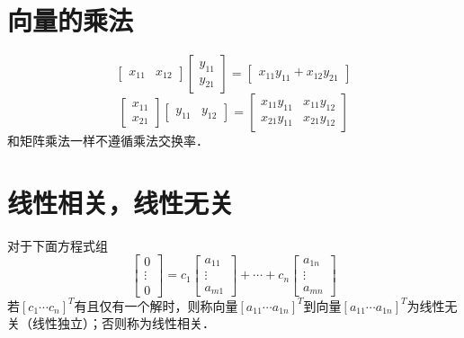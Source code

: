 \documentclass[12pt]{article}
\begin{document}
\begin{CJK}{UTF8}{gbsn}
\section{向量的乘法}
\begin{equation}
\left[
\begin{array}{cc}
x_{11} & x_{12}
\end{array}
\right]
\left[
\begin{array}{c}
y_{11} \\
y_{21}
\end{array}
\right]
=
\left[
\begin{array}{c}
x_{11}y_{11}+x_{12}y_{21}
\end{array}
\right]
\end{equation}
\begin{equation}
\left[
\begin{array}{c}
x_{11} \\
x_{21}
\end{array}
\right]
\left[
\begin{array}{cc}
y_{11} & y_{12}
\end{array}
\right]
=
\left[
\begin{array}{cc}
x_{11}y_{11} & x_{11}y_{12} \\
x_{21}y_{11} & x_{21}y_{12} 
\end{array}
\right]
\end{equation}
和矩阵乘法一样不遵循乘法交换率．
\section{线性相关，线性无关}
对于下面方程式组
\begin{equation}
\left[
\begin{array}{c}
0\\\vdots\\0
\end{array}
\right]=c_1\left[
\begin{array}{c}
a_{11}\\\vdots\\a_{m1}
\end{array}
\right]
+\cdots+
c_n\left[
\begin{array}{c}
a_{1n}\\\vdots\\a_{mn}
\end{array}
\right]
\end{equation}
若$[c_1 \cdots c_n]^T$有且仅有一个解时，则称向量$[a_{11} \cdots a_{1n}]^T$到向量$[a_{11} \cdots a_{1n}]^T$为线性无关（线性独立）；否则称为线性相关．

\end{CJK}
\end{document}
